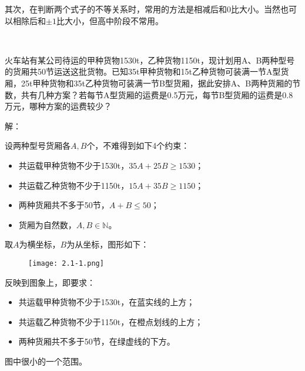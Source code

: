 其次，在判断两个式子的不等关系时，常用的方法是相减后和0比大小。当然也可以相除后和$\pm 1$比大小，但高中阶段不常用。

~

\begin{example}
火车站有某公司待运的甲种货物1530t，乙种货物1150t，现计划用A、B两种型号的货厢共50节运送这批货物。已知35t甲种货物和15t乙种货物可装满一节A型货厢，25t甲种货物和35t乙种货物可装满一节B型货厢，据此安排A、B两种货厢的节数，共有几种方案？若每节A型货厢的运费是0.5万元，每节B型货厢的运费是0.8万元，哪种方案的运费较少？
\end{example}

解：

设两种型号货厢各$A,B$个，不难得到如下4个约束：
\begin{itemize}
    \item 共运载甲种货物不少于1530t，$35A+25B\geqslant 1530$；
    \item 共运载乙种货物不少于1150t，$15A+35B\geqslant 1150$；
    \item 两种货厢共不多于50节，$A+B\leqslant 50$；
    \item 货厢为自然数，$A,B\in \mathbb{N} $。
\end{itemize}
取$A$为横坐标，$B$为从坐标，图形如下：
\begin{figure}[h]
\centering
\texttt{[image: 2.1-1.png]}
\end{figure}

反映到图象上，即要求：
\begin{itemize}
    \item 共运载甲种货物不少于1530t，在蓝实线的上方；
    \item 共运载乙种货物不少于1150t，在橙点划线的上方；
    \item 两种货厢共不多于50节，在绿虚线的下方。
\end{itemize}
图中很小的一个范围。

